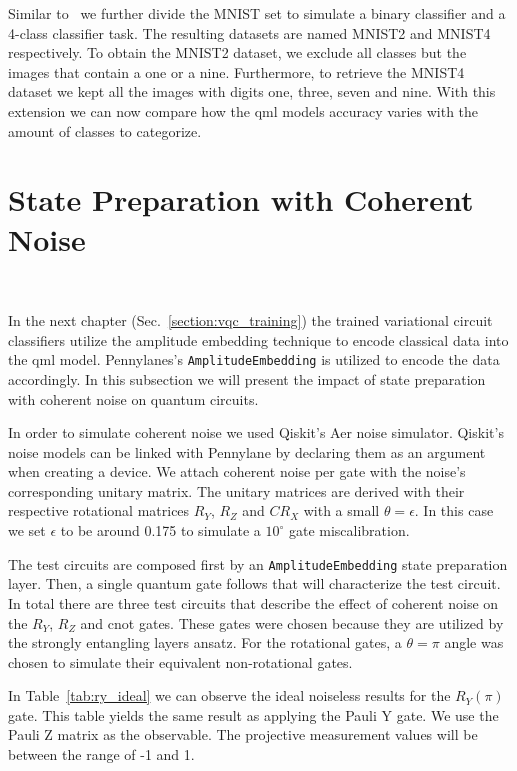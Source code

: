 Similar to~\cite{winderl_quantum_2023} we further divide the MNIST
set to simulate a binary classifier and a 4-class classifier task. The
resulting datasets are named MNIST2 and MNIST4 respectively. To obtain
the MNIST2 dataset, we exclude all classes but the images that contain
a one or a nine. Furthermore, to retrieve the MNIST4 dataset we kept
all the images with digits one, three, seven and nine. With this extension
we can now compare how the \ac{qml} models accuracy varies with the
amount of classes to categorize. \

\section{State Preparation with Coherent Noise}\label{section:state_preparation_noise} \

In the next chapter (Sec.~\ref{section:vqc_training}) the trained variational circuit classifiers
utilize the amplitude embedding technique to encode classical data
into the \ac{qml} model. Pennylanes's \colorbox{inline_gray}{\lstinline|AmplitudeEmbedding|}
is utilized to encode the data accordingly. In this subsection we will
present the impact of state preparation with coherent noise on quantum
circuits. \

In order to simulate coherent noise we used Qiskit's Aer noise simulator.
Qiskit's noise models can be linked with Pennylane by declaring them as
an argument when creating a device. We attach coherent noise per gate
with the noise's corresponding unitary matrix. The unitary matrices are
derived with their respective rotational matrices \(R_{Y}\), \(R_{Z}\) and 
\(CR_{X}\) with a small \(\theta = \epsilon\). In this case we set 
\(\epsilon\) to be around 0.175 to simulate a \(10^{\circ}\) gate
miscalibration. \

The test circuits are composed first by an
\colorbox{inline_gray}{\lstinline|AmplitudeEmbedding|} state preparation
layer. Then, a single quantum gate follows that will characterize the
test circuit. In total there are three test circuits that describe the
effect of coherent noise on the \(R_{Y}\), \(R_{Z}\) and \ac{cnot} gates.
These gates were chosen because they are utilized by the strongly
entangling layers ansatz. For the rotational gates, a \(\theta = \pi\)
angle was chosen to simulate their equivalent non-rotational gates.\

In Table~\ref{tab:ry_ideal} we can observe the ideal noiseless results
for the \(R_{Y}(\pi)\) gate. This table yields the same result as applying
the Pauli Y gate. We use the Pauli Z matrix as the observable. The 
projective measurement values will be between the range of -1 and 1.

